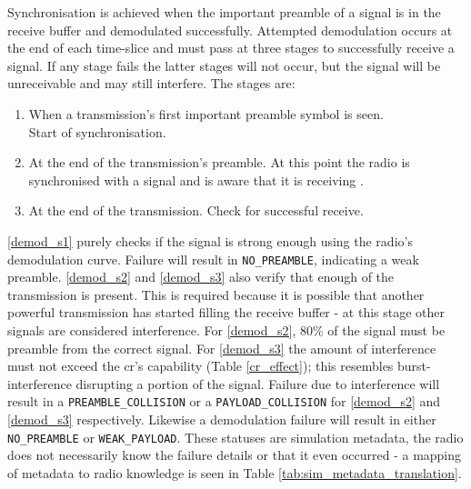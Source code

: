 Synchronisation is achieved when the important preamble of a signal is in the receive buffer and demodulated successfully. Attempted demodulation occurs at the end of each time-slice and must pass at three stages to successfully receive a signal. If any stage fails the latter stages will not occur, but the signal will be unreceivable and may still interfere. The stages are:
\vspace{-2mm}
\begin{enumerate}[label=\textbf{S\arabic*}]
  	\item {When a transmission's first important preamble symbol is seen.	 \\Start of synchronisation.} \label{demod_s1}
  	\item {At the end of the transmission's preamble. At this point the radio is synchronised with a signal and is aware that it is receiving \cite{3YP:LORA_SX12}.} \label{demod_s2} 
  	\item {At the end of the transmission. Check for successful receive.} \label{demod_s3} 
\end{enumerate}
\vspace{-2mm}

\ref{demod_s1} purely checks if the signal is strong enough using the radio's demodulation curve. Failure will result in \texttt{NO\_PREAMBLE}, indicating a weak preamble. \ref{demod_s2} and \ref{demod_s3} also verify that enough of the transmission is present. This is required because it is possible that another powerful transmission has started filling the receive buffer - at this stage other signals are considered interference. For \ref{demod_s2}, 80\% of the signal must be preamble from the correct signal. For \ref{demod_s3} the amount of interference must not exceed the \ac{cr}'s capability (Table \ref{cr_effect}); this resembles burst-interference disrupting a portion of the signal. Failure due to interference will result in a \texttt{PREAMBLE\_COLLISION} or a \texttt{PAYLOAD\_COLLISION} for \ref{demod_s2} and \ref{demod_s3} respectively. Likewise a demodulation failure will result in either \texttt{NO\_PREAMBLE} or \texttt{WEAK\_PAYLOAD}. These statuses are simulation metadata, the radio does not necessarily know the failure details or that it even occurred - a mapping of metadata to radio knowledge is seen in Table \ref{tab:sim_metadata_translation}.

